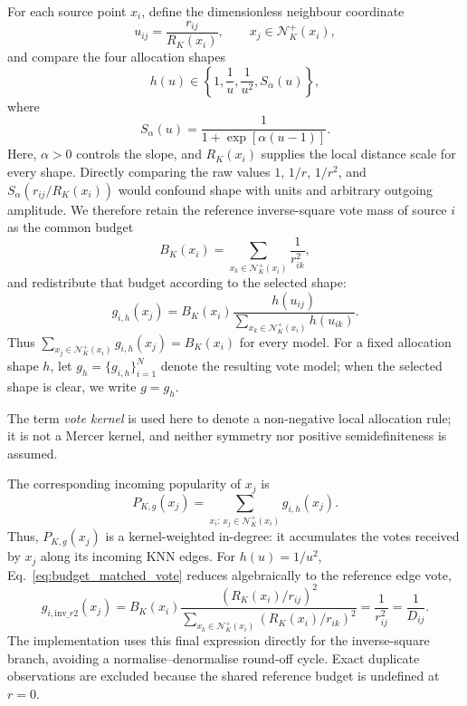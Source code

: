 \documentclass[review,12pt]{elsarticle}
\newcommand{\calN}{\mathcal{N}}
\begin{document}
For each source point $x_i$, define the dimensionless neighbour coordinate
\begin{equation}
u_{ij}=\frac{r_{ij}}{R_K(x_i)},
\qquad x_j\in\calN_K^+(x_i),
\label{eq:normalised_neighbour_distance}
\end{equation}
and compare the four allocation shapes
\begin{equation}
h(u)\in
\left\{
1,\frac{1}{u},\frac{1}{u^2},S_\alpha(u)
\right\},
\label{eq:vote_kernel_family}
\end{equation}
where
\begin{equation}
S_\alpha(u)=\frac{1}{1+\exp[\alpha(u-1)]}.
\label{eq:sigmoid_vote}
\end{equation}
Here, $\alpha>0$ controls the slope, and $R_K(x_i)$ supplies the local distance scale for every shape.  Directly comparing the raw values $1$, $1/r$, $1/r^2$, and $S_\alpha(r_{ij}/R_K(x_i))$ would confound shape with units and arbitrary outgoing amplitude.  We therefore retain the reference inverse-square vote mass of source $i$ as the common budget
\begin{equation}
B_K(x_i)=\sum_{x_k\in\calN_K^+(x_i)}\frac{1}{r_{ik}^2},
\label{eq:reference_source_budget}
\end{equation}
and redistribute that budget according to the selected shape:
\begin{equation}
g_{i,h}(x_j)=B_K(x_i)
\frac{h(u_{ij})}
{\displaystyle\sum_{x_k\in\calN_K^+(x_i)}h(u_{ik})}.
\label{eq:budget_matched_vote}
\end{equation}
Thus
$\sum_{x_j\in\calN_K^+(x_i)}g_{i,h}(x_j)=B_K(x_i)$
for every model. For a fixed allocation shape $h$, let
$g_h=\{g_{i,h}\}_{i=1}^{N}$ denote the resulting
vote model; when the selected shape is clear, we write $g=g_h$.

The term \emph{vote kernel} is used here to denote a non-negative local
allocation rule; it is not a Mercer kernel, and neither symmetry nor
positive semidefiniteness is assumed.

The corresponding incoming popularity of $x_j$ is
\begin{equation}
P_{K,g}(x_j)=
\sum_{x_i:\,x_j\in\calN_K^+(x_i)}g_{i,h}(x_j).
\label{eq:reverse_popularity}
\end{equation}
Thus, $P_{K,g}(x_j)$ is a kernel-weighted in-degree: it accumulates the
votes received by $x_j$ along its incoming KNN edges.
For $h(u)=1/u^2$, Eq.~\eqref{eq:budget_matched_vote} reduces algebraically to the reference edge vote,
\begin{equation}
g_{i,\mathrm{inv}\_r2}(x_j)
=B_K(x_i)\frac{(R_K(x_i)/r_{ij})^2}
{\sum_{x_k\in\calN_K^+(x_i)}(R_K(x_i)/r_{ik})^2}
=\frac{1}{r_{ij}^2}=\frac{1}{D_{ij}}.
\label{eq:reference_inverse_square_vote}
\end{equation}
The implementation uses this final expression directly for the inverse-square branch, avoiding a normalise--denormalise round-off cycle. Exact duplicate observations are excluded because the shared reference budget is undefined at $r=0$.
\end{document}
